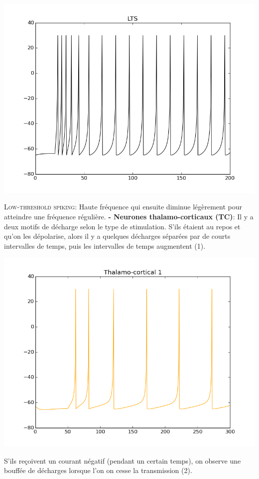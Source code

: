 \documentclass[10pt]{article}
\begin{document}
\begin{center}
\includegraphics[scale=0.5]{figure_8}
\end{center}
\textsc{Low-threshold spiking:} Haute fréquence qui ensuite diminue légèrement pour atteindre une fréquence régulière.
\justify
\textbf{- Neurones thalamo-corticaux (TC)}: Il y a deux motifs de décharge selon le type de stimulation.
S’ils étaient au repos et qu’on les dépolarise, alors il y a quelques décharges séparées par de courts intervalles de temps, puis les intervalles de temps augmentent (1).
\begin{center}
\includegraphics[scale=0.5]{figure_5}
\end{center}
\justify
S’ils reçoivent un courant négatif (pendant un certain temps), on observe une bouffée de décharges lorsque l’on on cesse la transmission (2).
\end{document}
